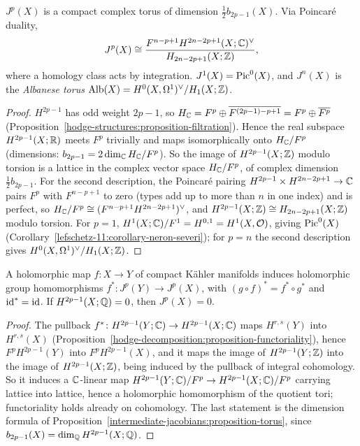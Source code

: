 \begin{proposition}\label{intermediate-jacobians:proposition-torus}
$J^p(X)$ is a compact complex torus of dimension $\frac12b_{2p-1}(X)$. Via Poincar\'e duality,
\[
J^p(X) \cong \frac{F^{n-p+1}H^{2n-2p+1}(X; \mathbb{C})^\vee}{H_{2n-2p+1}(X; \mathbb{Z})} ,
\]
where a homology class acts by integration. $J^1(X) = \operatorname{Pic}^0(X)$, and $J^n(X)$ is the \emph{Albanese torus} $\mathrm{Alb}(X) = H^0(X, \Omega^1)^\vee/H_1(X; \mathbb{Z})$.
\end{proposition}

\begin{proof}
$H^{2p-1}$ has odd weight $2p - 1$, so $H_{\mathbb{C}} = F^p \oplus \overline{F^{(2p-1)-p+1}} = F^p \oplus \overline{F^p}$ (Proposition~\ref{hodge-structures:proposition-filtration}). Hence the real subspace
$H^{2p-1}(X; \mathbb{R})$ meets $F^p$ trivially and maps isomorphically onto $H_{\mathbb{C}}/F^p$ (dimensions: $b_{2p-1} = 2\dim_{\mathbb{C}} H_{\mathbb{C}}/F^p$). So the image of $H^{2p-1}(X; \mathbb{Z})$ modulo torsion is a lattice in
the complex vector space $H_{\mathbb{C}}/F^p$, of complex dimension $\frac12b_{2p-1}$. For the second description, the Poincar\'e pairing $H^{2p-1} \times H^{2n-2p+1} \to \mathbb{C}$ pairs $F^p$ with
$F^{n-p+1}$ to zero (types add up to more than $n$ in one index) and is perfect, so $H_{\mathbb{C}}/F^p \cong (F^{n-p+1}H^{2n-2p+1})^\vee$, and $H^{2p-1}(X; \mathbb{Z}) \cong H_{2n-2p+1}(X; \mathbb{Z})$ modulo torsion.
For $p = 1$, $H^1(X; \mathbb{C})/F^1 = H^{0,1} = H^1(X, \mathcal{O})$, giving $\operatorname{Pic}^0(X)$ (Corollary~\ref{lefschetz-11:corollary-neron-severi}); for $p = n$ the second description gives
$H^0(X, \Omega^1)^\vee/H_1(X; \mathbb{Z})$.
\end{proof}

\begin{proposition}\label{intermediate-jacobians:proposition-functoriality}
A holomorphic map $f \colon X \to Y$ of compact K\"ahler manifolds induces holomorphic group homomorphisms $f^* \colon J^p(Y) \to J^p(X)$, with $(g \circ f)^* = f^* \circ g^*$ and $\mathrm{id}^* = \mathrm{id}$. If
$H^{2p-1}(X; \mathbb{Q}) = 0$, then $J^p(X) = 0$.
\end{proposition}

\begin{proof}
The pullback $f^* \colon H^{2p-1}(Y; \mathbb{C}) \to H^{2p-1}(X; \mathbb{C})$ maps $H^{r,s}(Y)$ into $H^{r,s}(X)$ (Proposition~\ref{hodge-decomposition:proposition-functoriality}), hence $F^pH^{2p-1}(Y)$ into
$F^pH^{2p-1}(X)$, and it maps the image of $H^{2p-1}(Y; \mathbb{Z})$ into the image of $H^{2p-1}(X; \mathbb{Z})$, being induced by the pullback of integral cohomology. So it induces a $\mathbb{C}$-linear map
$H^{2p-1}(Y; \mathbb{C})/F^p \to H^{2p-1}(X; \mathbb{C})/F^p$ carrying lattice into lattice, hence a holomorphic homomorphism of the quotient tori; functoriality holds already on cohomology. The last statement is
the dimension formula of Proposition~\ref{intermediate-jacobians:proposition-torus}, since $b_{2p-1}(X) = \dim_{\mathbb{Q}} H^{2p-1}(X; \mathbb{Q})$.
\end{proof}

